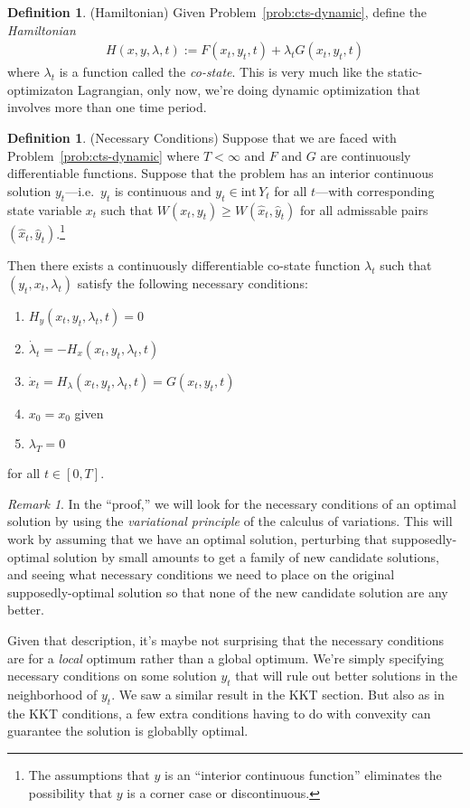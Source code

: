 \documentclass[12pt]{article}
\numberwithin{equation}{section} %
\theoremstyle{plain}
\theoremstyle{definition}
\newtheorem{defn}[thm]{Definition}
\theoremstyle{remark}
\newtheorem*{rmk}{Remark}
\begin{document}
\begin{defn}{(Hamiltonian)}
Given Problem~\ref{prob:cts-dynamic}, define the \emph{Hamiltonian}
\begin{align*}
  H(x,y,\lambda,t) := F(x_t,y_t,t) + \lambda_t G(x_t,y_t,t)
\end{align*}
where $\lambda_t$ is a function called the \emph{co-state}.
This is very much like the static-optimizaton Lagrangian, only now,
we're doing dynamic optimization that involves more than one time
period.
\end{defn}

\begin{defn}{(Necessary Conditions)}
Suppose that we are faced with Problem~\ref{prob:cts-dynamic} where
$T<\infty$ and $F$ and $G$ are continuously differentiable functions.
Suppose that the problem has an interior continuous solution
$y_t$---i.e.\ $y_t$ is continuous and $y_t\in \text{int} \, Y_t$ for all
$t$---with corresponding state variable $x_t$ such that $W(x_t,y_t) \geq
W(\hat{x}_t,\hat{y}_t)$ for all admissable pairs
$(\hat{x}_t,\hat{y}_t)$.\footnote{%
The assumptions that $y$ is an ``interior continuous function''
eliminates the possibility that $y$ is a corner case or discontinuous.
}

Then there exists a continuously differentiable co-state function
$\lambda_t$ such that $(y_t,x_t,\lambda_t)$ satisfy the following
necessary conditions:
\begin{enumerate}
  \item $H_y (x_t,y_t,\lambda_t,t) = 0$
  \item $\dot{\lambda}_t = - H_x(x_t, y_t, \lambda_t, t)$
  \item $\dot{x}_t = H_\lambda(x_t,y_t,\lambda_t,t) = G(x_t, y_t, t)$
  \item $x_0=x_0$ given
  \item $\lambda_T=0$
\end{enumerate}
for all $t\in[0,T]$.
\end{defn}
\begin{rmk}
In the ``proof,'' we will look for the necessary conditions of an
optimal solution by using the \emph{variational principle} of the
calculus of variations.  This will work by assuming that we have an
optimal solution, perturbing that supposedly-optimal solution by small
amounts to get a family of new candidate solutions, and seeing what
necessary conditions we need to place on the original supposedly-optimal
solution so that none of the new candidate solution are any better.

Given that description, it's maybe not surprising that the necessary
conditions are for a \emph{local} optimum rather than a global optimum.
We're simply specifying necessary conditions on some solution $y_t$ that
will rule out better solutions in the neighborhood of $y_t$. We saw a
similar result in the KKT section. But also as in the KKT conditions, a
few extra conditions having to do with convexity can guarantee the
solution is globablly optimal.
\end{rmk}
\end{document}

